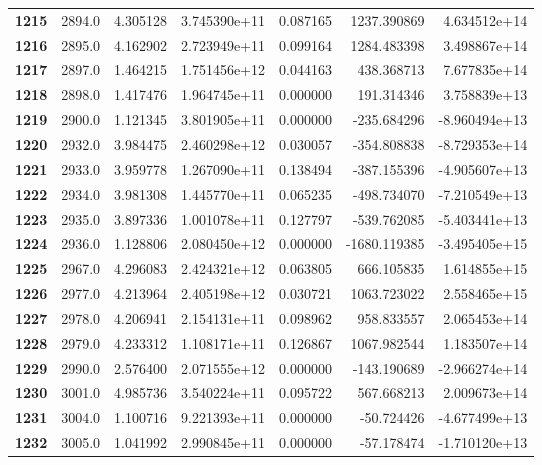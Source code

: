 \documentclass{report}[12pt]
\begin{document}
\begin{center}
\begin{tabular}{lrrrrrr}
\textbf{1215} &         2894.0 &   4.305128 &  3.745390e+11 &    0.087165 &  1237.390869 &  4.634512e+14 \\
\textbf{1216} &         2895.0 &   4.162902 &  2.723949e+11 &    0.099164 &  1284.483398 &  3.498867e+14 \\
\textbf{1217} &         2897.0 &   1.464215 &  1.751456e+12 &    0.044163 &   438.368713 &  7.677835e+14 \\
\textbf{1218} &         2898.0 &   1.417476 &  1.964745e+11 &    0.000000 &   191.314346 &  3.758839e+13 \\
\textbf{1219} &         2900.0 &   1.121345 &  3.801905e+11 &    0.000000 &  -235.684296 & -8.960494e+13 \\
\textbf{1220} &         2932.0 &   3.984475 &  2.460298e+12 &    0.030057 &  -354.808838 & -8.729353e+14 \\
\textbf{1221} &         2933.0 &   3.959778 &  1.267090e+11 &    0.138494 &  -387.155396 & -4.905607e+13 \\
\textbf{1222} &         2934.0 &   3.981308 &  1.445770e+11 &    0.065235 &  -498.734070 & -7.210549e+13 \\
\textbf{1223} &         2935.0 &   3.897336 &  1.001078e+11 &    0.127797 &  -539.762085 & -5.403441e+13 \\
\textbf{1224} &         2936.0 &   1.128806 &  2.080450e+12 &    0.000000 & -1680.119385 & -3.495405e+15 \\
\textbf{1225} &         2967.0 &   4.296083 &  2.424321e+12 &    0.063805 &   666.105835 &  1.614855e+15 \\
\textbf{1226} &         2977.0 &   4.213964 &  2.405198e+12 &    0.030721 &  1063.723022 &  2.558465e+15 \\
\textbf{1227} &         2978.0 &   4.206941 &  2.154131e+11 &    0.098962 &   958.833557 &  2.065453e+14 \\
\textbf{1228} &         2979.0 &   4.233312 &  1.108171e+11 &    0.126867 &  1067.982544 &  1.183507e+14 \\
\textbf{1229} &         2990.0 &   2.576400 &  2.071555e+12 &    0.000000 &  -143.190689 & -2.966274e+14 \\
\textbf{1230} &         3001.0 &   4.985736 &  3.540224e+11 &    0.095722 &   567.668213 &  2.009673e+14 \\
\textbf{1231} &         3004.0 &   1.100716 &  9.221393e+11 &    0.000000 &   -50.724426 & -4.677499e+13 \\
\textbf{1232} &         3005.0 &   1.041992 &  2.990845e+11 &    0.000000 &   -57.178474 & -1.710120e+13 \\

\end{tabular}
\end{center}
\end{document}
